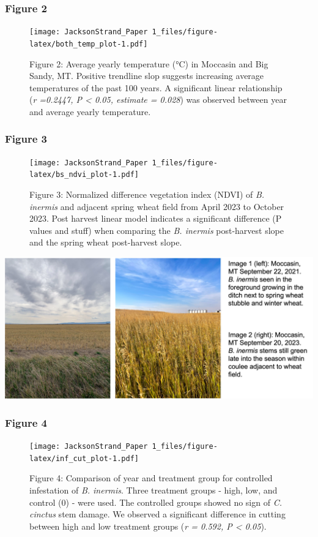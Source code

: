 \documentclass[
]{article}
\begin{document}
\subsubsection{Figure 2}\label{figure2}

\begin{figure}
\centering
\texttt{[image: JacksonStrand\_Paper 1\_files/figure-latex/both\_temp\_plot-1.pdf]}
\caption{Figure 2: Average yearly temperature (°C) in Moccasin and Big
Sandy, MT. Positive trendline slop suggests increasing average
temperatures of the past 100 years. A significant linear relationship
(\emph{r =0.2447, P \textless{} 0.05, estimate = 0.028}) was observed
between year and average yearly temperature.}
\end{figure}

\subsubsection{Figure 3}\label{figure3}

\begin{figure}
\centering
\texttt{[image: JacksonStrand\_Paper 1\_files/figure-latex/bs\_ndvi\_plot-1.pdf]}
\caption{Figure 3: Normalized difference vegetation index (NDVI) of
\emph{B. inermis} and adjacent spring wheat field from April 2023 to
October 2023. Post harvest linear model indicates a significant
difference (P values and stuff) when comparing the \emph{B. inermis}
post-harvest slope and the spring wheat post-harvest slope.}
\end{figure}

\includegraphics{Images/brome_images.jpg}

\subsubsection{Figure 4}\label{figure4}

\begin{figure}
\centering
\texttt{[image: JacksonStrand\_Paper 1\_files/figure-latex/inf\_cut\_plot-1.pdf]}
\caption{Figure 4: Comparison of year and treatment group for controlled
infestation of \emph{B. inermis}. Three treatment groups - high, low,
and control (0) - were used. The controlled groups showed no sign of
\emph{C. cinctus} stem damage. We observed a significant difference in
cutting between high and low treatment groups (\emph{r = 0.592, P
\textless{} 0.05}).}
\end{figure}
\end{document}
